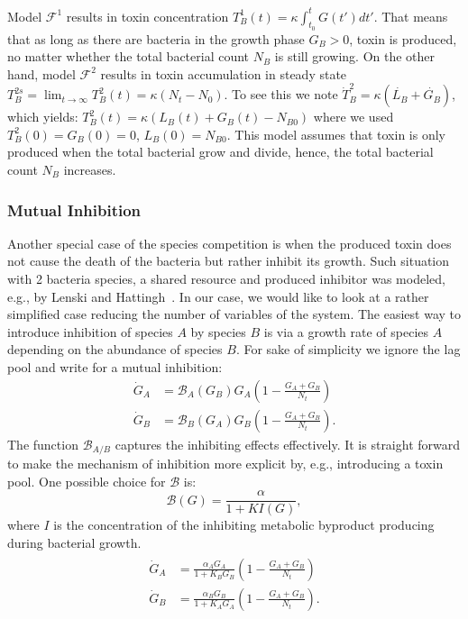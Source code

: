 \documentclass[10pt,A4paper]{article}
\numberwithin{equation}{section}
\begin{document}
%
Model $\mathcal{F}^1$ results in toxin concentration $T_B^1(t)=\kappa\int_{t_0}^tG(t')dt'$.
That means that as long as there are bacteria in the growth phase $G_B>0$, toxin is produced, no matter whether the total bacterial count $N_B$ is still growing.
On the other hand, model $\mathcal{F}^2$ results in toxin accumulation in steady state $T_B^{2s}=\lim_{t\to\infty}T_B^2(t)=\kappa(N_t-N_0)$.
To see this we note $\dot{T}_B^2=\kappa(\dot{L_B}+\dot{G_B})$, which yields: $T_B^2(t)=\kappa(L_B(t)+G_B(t)-N_{B0})$ where we used $T_B^2(0)=G_B(0)=0$, $L_B(0)=N_{B0}$.
This model assumes that toxin is only produced when the total bacterial grow and divide, hence, the total bacterial count $N_B$ increases.
%
%
\subsubsection{Mutual Inhibition}
Another special case of the species competition is when the produced toxin does not cause the death of the bacteria but rather inhibit its growth.
Such situation with 2 bacteria species, a shared resource and produced inhibitor was modeled, e.g., by Lenski and Hattingh~\cite{lenski_coexistence_1986}.
In our case, we would like to look at a rather simplified case reducing the number of variables of the system.
The easiest way to introduce inhibition of species $A$ by species $B$ is via a growth rate of species $A$ depending on the abundance of species $B$.
For sake of simplicity we ignore the lag pool and write for a mutual inhibition:
\begin{align}
    \dot{G}_A &= \mathcal{B}_A(G_B)G_A\left(1 - \frac{G_A+G_B}{N_t}\right)\\
    \dot{G}_B &= \mathcal{B}_B(G_A) G_B\left(1-\frac{G_A+G_B}{N_t}\right).
\end{align}
The function $\mathcal{B}_{A/B}$ captures the inhibiting effects effectively.
It is straight forward to make the mechanism of inhibition more explicit by, e.g., introducing a toxin pool.
One possible choice for $\mathcal{B}$ is:
\begin{equation}
    \mathcal{B}(G) = \frac{\alpha}{1+KI(G)},
\end{equation}
where $I$ is the concentration of the inhibiting metabolic byproduct producing during bacterial growth.
\begin{align}\begin{split}
    \dot{G}_A &= \frac{\alpha_A G_A}{1+K_BG_B}\left(1 - \frac{G_A+G_B}{N_t}\right)\\
    \dot{G}_B &= \frac{\alpha_B G_B}{1+K_AG_A}\left(1-\frac{G_A+G_B}{N_t}\right).
\end{split}\end{align}
\end{document}
